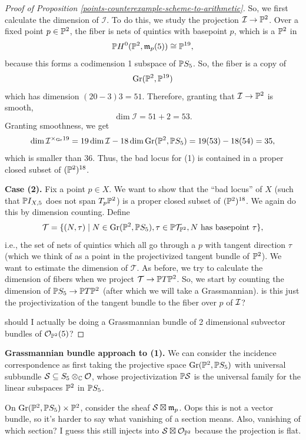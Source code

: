 \documentclass[12pt]{article}
\newcommand{\Gr}{\mathrm{Gr}}
\begin{document}
\begin{itemize}
\begin{proof}[Proof of Proposition \ref{points-counterexample-scheme-to-arithmetic}]
        So, we first calculate the dimension of $\mathcal{I}$. To do this, we study the projection $\mathcal{I}\to \P^2$. Over a fixed point $p\in\P^2$, the fiber is nets of quintics with basepoint $p$, which is a $\P^2$ in
        \[\P H^0(\P^2, \fm_p(5)) \cong \P^{19},\]
        because this forms a codimension 1 subspace of $\P S_5$. So, the fiber is a copy of
        \[\Gr(\P^2, \P^{19})\]
        which has dimension $(20-3)3 = 51$. Therefore, {\color{red} granting that $\mathcal{I}\to \P^2$ is smooth},
        \[\dim \mathcal{I} = 51+2 = 53.\]
        {\color{red} Granting smoothness}, we get
        \[\dim \mathcal{I}^{\times_{\Gr} 19} = 19\dim \mathcal{I} - 18 \dim \Gr(\P^2,\P S_5) = 19(53)-18(54)=35,\]
        which is smaller than 36. Thus, the bad locus for (1) is contained in a proper closed subset of $(\P^2)^{18}$.

        \textbf{Case (2).} Fix a point $p\in X$. We want to show that the ``bad locus'' of $X$ (such that $\P I_{X,5}$ does not span $T_p \P^2$) is a proper closed subset of $(\P^2)^{18}$. We again do this by dimension counting. Define
        \[\mathcal{T} = \{(N,\tau) \mid N\in \Gr(\P^2, \P S_5), \tau \in \P \mathcal T_{\P^2}, N \text{ has basepoint $\tau$}\},\]
        i.e., the set of nets of quintics which all go through a $p$ with tangent direction $\tau$ (which we think of as a point in the projectivized tangent bundle of $\P^2$). We want to estimate the dimension of $\mathcal{T}$. As before, we try to calculate the dimension of fibers when we project $\mathcal{T} \to \P T\P^2$. So, we start by counting the dimension of $\P S_5 \to \P T \P^2$ (after which we will take a Grassmannian). {\color{red} is this just the projectivization of the tangent bundle to the fiber over $p$ of $\cI$?}

        {\color{red} should I actually be doing a Grassmannian bundle of 2 dimensional subvector bundles of $\cO_{\P^2}(5)$?}
    \end{proof}


    \textbf{Grassmannian bundle approach to (1).} We can consider the incidence correspondence as first taking the projective space $\Gr(\P^2,\P S_5)$ with universal subbundle $\mathcal{S}\subseteq S_5\otimes_\C \cO$, whose projectivization $\P\mathcal{S}$ is the universal family for the linear subspaces $\P^2$ in $\P S_5$.
    
    On $\Gr(\P^2,\P S_5) \times \P^2$, consider the sheaf $\mathcal{S} \boxtimes \fm_p$. Oops this is not a vector bundle, so it's harder to say what vanishing of a section means. Also, vanishing of which section? I guess this still injects into $\mathcal{S} \boxtimes \cO_{\P^2}$ because the projection is flat.


\end{itemize}
\end{document}
